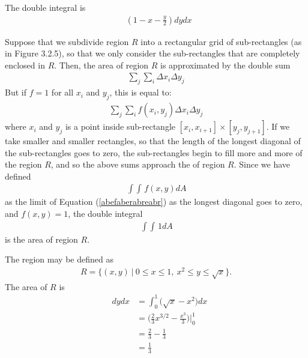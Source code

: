 The double integral is 
\begin{align*}
  \mathop{\int_{0}^{1} \! \int_0^{2-2x} } (1 - x - \frac{y}{2}) dydx
\end{align*} 
\EEN
\item %
\BEN
\item
Suppose that we subdivide region $R$ into a rectangular grid of sub-rectangles (as in Figure 3.2.5), so that we only consider the sub-rectangles that are completely enclosed in $R$. Then, the area of region $R$ is approximated by the double sum
\begin{align*}
  \sum_j\sum_i\Delta x_i \Delta y_j
\end{align*}
But if $f=1$ for all $x_i$ and $y_j$, this is equal to:
\begin{align}\label{abefaberabreabr}
  \sum_j\sum_i f(x_i,y_j) \Delta x_i \Delta y_j
\end{align}
where $x_i$ and $y_j$ is a point inside sub-rectangle $[x_i,x_{i+1}]\times[y_j,y_{j+1}]$. 
If we take smaller and smaller rectangles, so that the length of the longest diagonal of the sub-rectangles goes to zero, the sub-rectangles begin to fill more and more of the region $R$, and so the above sums approach the   of region $R$. Since we have defined
\begin{align*}
  \mathop{\int \!\!\! \int} f(x,y) dA
\end{align*}
as the limit of Equation (\ref{abefaberabreabr}) as the longest diagonal goes to zero, and $f(x,y)=1$, the double integral 
\begin{align*}
  \mathop{\int \!\!\! \int} 1 dA
\end{align*}
is the area of region $R$. 
\item The region may be defined as
\begin{align*}
  R = \{ (x,y) \ | \ 0 \le x \le 1, \ x^2 \le y \le \sqrt{x} \}.
\end{align*}
The area of $R$ is 
\begin{align*}
  \mathop{\int_0^1 \!\!\! \int_{x^2}^{\sqrt{x}}} dydx 
  &= \int_0^1 \Big(\sqrt{x} - x^2 \Big) dx \\
  &= \Big(\frac{2}{3}x^{3/2}  - \frac{x^3}{3} \Big)\Big|_0^1 \\
  &= \frac{2}{3} - \frac{1}{3} \\
  &= \frac{1}{3}
\end{align*}
\EEN
